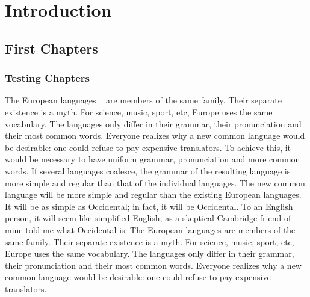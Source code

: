 \def\mytitle{Methods of coevolution}
\def\myauthor{David Ochoa}
\def\mykeywords{mirrortree, coevolution, thesis, protein, interactions, ochoa, pazos, valencia}

\def\bibliocommand{}
\def\bibliostyle{plainnat}

\chapter{Introduction}
\label{introduction}
\section{First Chapters}
\subsection{Testing Chapters}
The European languages ~\citep{Ochoa:2013jf} are members of the same family. Their separate existence is a myth. For science, music, sport, etc, Europe uses the same vocabulary. The languages only differ in their grammar, their pronunciation and their most common words. Everyone realizes why a new common language would be desirable: one could refuse to pay expensive translators. To achieve this, it would be necessary to have uniform grammar, pronunciation and more common words. If several languages coalesce, the grammar of the resulting language is more simple and regular than that of the individual languages. The new common language will be more simple and regular than the existing European languages. It will be as simple as Occidental; in fact, it will be Occidental. To an English person, it will seem like simplified English, as a skeptical Cambridge friend of mine told me what Occidental is. The European languages are members of the same family. Their separate existence is a myth. For science, music, sport, etc, Europe uses the same vocabulary. The languages only differ in their grammar, their pronunciation and their most common words. Everyone realizes why a new common language would be desirable: one could refuse to pay expensive translators.

